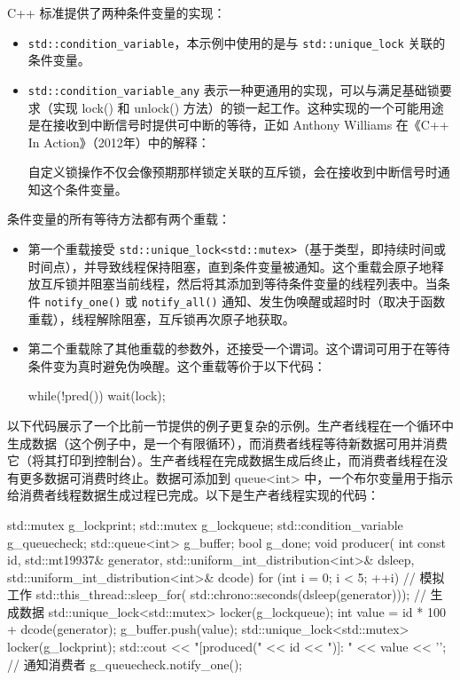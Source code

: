 C++ 标准提供了两种条件变量的实现：

\begin{itemize}
\item
\verb|std::condition_variable|，本示例中使用的是与 \verb|std::unique_lock| 关联的条件变量。

\item
\verb|std::condition_variable_any| 表示一种更通用的实现，可以与满足基础锁要求（实现 lock() 和 unlock() 方法）的锁一起工作。这种实现的一个可能用途是在接收到中断信号时提供可中断的等待，正如 Anthony Williams 在《C++ In Action》（2012年）中的解释：

\begin{myTip}
自定义锁操作不仅会像预期那样锁定关联的互斥锁，会在接收到中断信号时通知这个条件变量。
\end{myTip}
\end{itemize}

条件变量的所有等待方法都有两个重载：

\begin{itemize}
\item
第一个重载接受 \verb|std::unique_lock<std::mutex>|（基于类型，即持续时间或时间点），并导致线程保持阻塞，直到条件变量被通知。这个重载会原子地释放互斥锁并阻塞当前线程，然后将其添加到等待条件变量的线程列表中。当条件 \verb|notify_one()| 或 \verb|notify_all()| 通知、发生伪唤醒或超时时（取决于函数重载），线程解除阻塞，互斥锁再次原子地获取。

\item
第二个重载除了其他重载的参数外，还接受一个谓词。这个谓词可用于在等待条件变为真时避免伪唤醒。这个重载等价于以下代码：

\begin{cpp}
while(!pred())
    wait(lock);
\end{cpp}
\end{itemize}

以下代码展示了一个比前一节提供的例子更复杂的示例。生产者线程在一个循环中生成数据（这个例子中，是一个有限循环），而消费者线程等待新数据可用并消费它（将其打印到控制台）。生产者线程在完成数据生成后终止，而消费者线程在没有更多数据可消费时终止。数据可添加到 queue<int> 中，一个布尔变量用于指示给消费者线程数据生成过程已完成。以下是生产者线程实现的代码：

\begin{cpp}
std::mutex g_lockprint;
std::mutex g_lockqueue;
std::condition_variable g_queuecheck;
std::queue<int> g_buffer;
bool g_done;
void producer(
int const id,
std::mt19937& generator,
std::uniform_int_distribution<int>& dsleep,
std::uniform_int_distribution<int>& dcode)
{
    for (int i = 0; i < 5; ++i)
    {
        // 模拟工作
        std::this_thread::sleep_for(
        std::chrono::seconds(dsleep(generator)));
        // 生成数据
        {
            std::unique_lock<std::mutex> locker(g_lockqueue);
            int value = id * 100 + dcode(generator);
            g_buffer.push(value);
            {
                std::unique_lock<std::mutex> locker(g_lockprint);
                std::cout << "[produced(" << id << ")]: " << value << '\n';
            }
        }
        // 通知消费者
        g_queuecheck.notify_one();
    }
}
\end{cpp}

